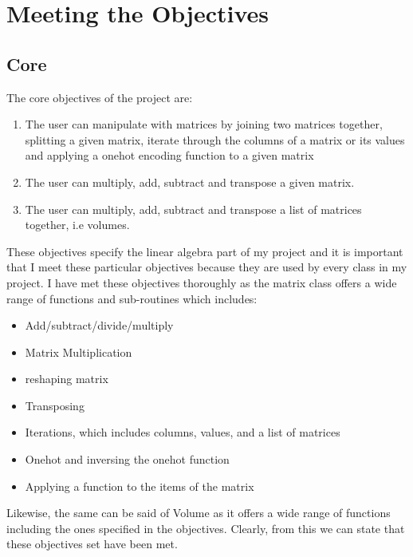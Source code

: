 \section{Meeting the Objectives}
\subsection{Core}
The core objectives of the project are: 
\begin{enumerate}
    \item The user can manipulate with matrices by joining two matrices together, splitting a given matrix, iterate through the columns of a matrix or its values and applying a onehot encoding function to a given matrix
    \item The user can multiply, add, subtract and transpose a given matrix.
    \item The user can multiply, add, subtract and transpose a list of matrices together, i.e volumes.
\end{enumerate}
These objectives specify the linear algebra part of my project and it is important that I meet these particular objectives because they are used by every class in my project. I have met these objectives thoroughly as the matrix class offers a wide range of functions and sub-routines which includes:
\begin{itemize}
    \item Add/subtract/divide/multiply
    \item Matrix Multiplication
    \item reshaping matrix
    \item Transposing
    \item Iterations, which includes columns, values, and a list of matrices
    \item Onehot and inversing the onehot function
    \item Applying a function to the items of the matrix
\end{itemize}
Likewise, the same can be said of Volume as it offers a wide range of functions including the ones specified in the objectives. Clearly, from this we can state that these objectives set have been met.

